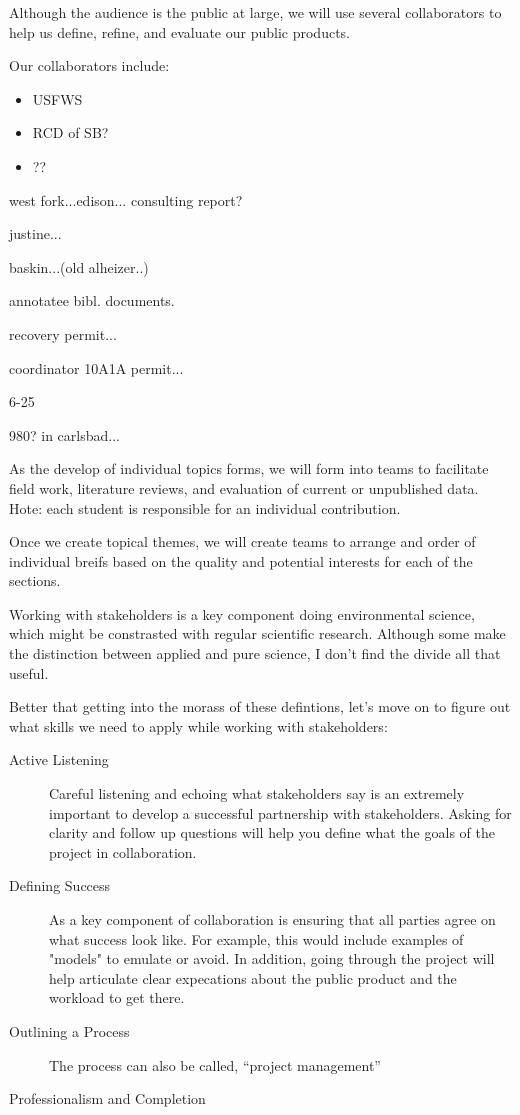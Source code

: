 \documentclass{article}\usepackage[]{graphicx}\usepackage[]{color}
\begin{document}
Although the audience is the public at large, we will use several collaborators to help us define, refine, and evaluate our public products.  

Our collaborators include: 

\begin{itemize}
  \item USFWS
  \item RCD of SB?
  \item ??
\end{itemize}

west fork...edison... consulting report?



justine...

baskin...(old alheizer..)

annotatee bibl. documents.

recovery permit...

coordinator 10A1A permit...

6-25


980? in carlsbad...

As the develop of individual topics forms, we will form into teams to facilitate field work, literature reviews, and evaluation of current or unpublished data. Hote: each student is responsible for an individual contribution. 

Once we create topical themes, we will create teams to arrange and order of  individual breifs based on the quality and potential interests for each of the sections.  

Working with stakeholders is a key component doing environmental science, which might be constrasted with regular scientific research. Although some make the distinction between applied and pure science, I don't find the divide all that useful. 

Better that getting into the morass of these defintions, let's move on to figure out what skills we need to apply while working with stakeholders:

\begin{description}
  \item[Active Listening] Careful listening and echoing what stakeholders say is an extremely important to develop a successful partnership with stakeholders. Asking for clarity and follow up questions will help you define what the goals of the project in collaboration.
  \item[Defining Success] As a key component of collaboration is ensuring that all parties agree on what success look like. For example, this would include examples of "models" to emulate or avoid. In addition, going through the project will help articulate clear expecations about the public product and the workload to get there.
  \item[Outlining a Process] The process can also be called, ``project management''
  \item[Professionalism and Completion]
\end{description}
\end{document}
